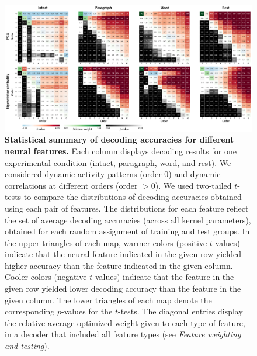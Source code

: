 \documentclass[english]{article}
\begin{document}
\begin{figure}[tp]
\centering
\includegraphics[width=1\textwidth]{figs/stats_heatmaps}
\caption{\textbf{Statistical summary of decoding accuracies for
    different neural features.}  Each column displays decoding
  results for one experimental condition (intact, paragraph, word, and
  rest).  We considered dynamic activity patterns (order 0) and
  dynamic correlations at different orders (order $> 0$).  We used
  two-tailed $t$-tests to compare the
  distributions of decoding accuracies obtained using each pair of
  features.  The distributions for each feature reflect the set of
  average decoding accuracies (across all kernel parameters), obtained
  for each random assignment of training and test groups.
  In the upper triangles of each map, warmer colors (positive $t$-values) indicate that the
  neural feature indicated in the given row yielded higher accuracy than the
  feature indicated in the given column.  Cooler colors (negative
  $t$-values) indicate that
  the feature in the given row yielded lower decoding accuracy than
  the feature in the given column.  The lower triangles of each map
  denote the corresponding $p$-values for the $t$-tests.  The diagonal
  entries display the relative average optimized weight given to each type of feature, in
  a decoder that included all feature types (see \textit{Feature
    weighting and testing}).}
\label{fig:ttests}
\end{figure}
\end{document}
